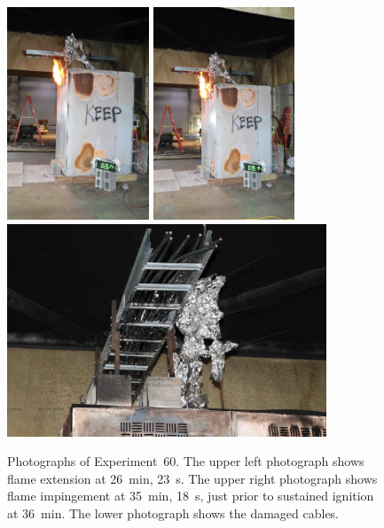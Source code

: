\begin{figure}[p]
\centering
\includegraphics[height=2.50in,angle=-90]{../FIGURES/Test_60_26_min_23_s}
\includegraphics[height=2.50in,angle=-90]{../FIGURES/Test_60_35_min_18_s} \\
\includegraphics[height=2.50in]{../FIGURES/Test_60_scar}
\caption[Photographs of Experiment~60]{Photographs of Experiment~60. The upper left photograph shows flame extension at 26~min, 23~s. The upper right photograph shows flame impingement at 35~min, 18~s, just prior to sustained ignition at 36~min. The lower photograph shows the damaged cables.}
\label{fig:Test_60_photos}
\end{figure}


\clearpage

